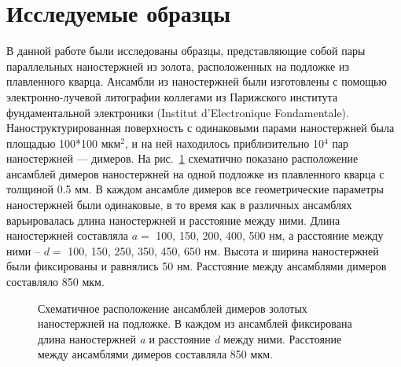 \section{Исследуемые образцы}

В данной работе были исследованы образцы, представляющие собой пары параллельных наностержней из золота, расположенных на подложке из плавленного кварца. Ансамбли из наностержней были изготовлены с помощью  электронно-лучевой литографии коллегами из Парижского института фундаментальной электроники (Institut d'Electronique Fondamentale). Наноструктурированная поверхность с одинаковыми парами наностержней была площадью 100*100 мкм$ ^2 $, и на ней находилось приблизительно 10$ ^4 $ пар наностержней --- димеров. 
На рис.~\ref{img:sample} схематично показано расположение ансамблей димеров наностержней на одной подложке из плавленного кварца с толщиной 0.5 мм. В каждом ансамбле димеров все геометрические параметры наностержней были одинаковые, в то время как в различных ансамблях варьировалась длина наностержней и расстояние между ними. Длина наностержней составляла $ a = $ 100, 150, 200, 400, 500 нм, а расстояние между ними -- $ d = $ 100, 150, 250, 350, 450, 650 нм. Высота и ширина наностержней были фиксированы и равнялись 50 нм. Расстояние между ансамблями димеров составляло 850 мкм. 
\begin{figure}[!h]
\caption{Схематичное расположение ансамблей димеров золотых наностержней на подложке. В каждом из ансамблей фиксирована длина наностержней \textit{a} и расстояние \textit{d} между ними. Расстояние между ансамблями димеров составляла 850 мкм.}
\label{img:sample}
\end{figure}

